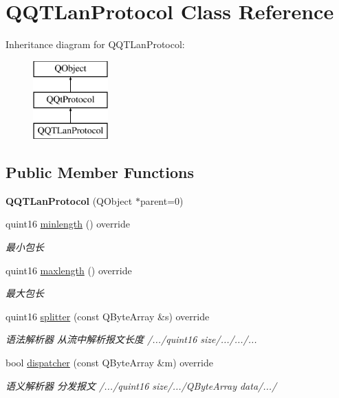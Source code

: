 \hypertarget{class_q_q_t_lan_protocol}{}\section{Q\+Q\+T\+Lan\+Protocol Class Reference}
\label{class_q_q_t_lan_protocol}
Inheritance diagram for Q\+Q\+T\+Lan\+Protocol\+:\begin{figure}[H]
\begin{center}
\leavevmode
\includegraphics[height=3.000000cm]{class_q_q_t_lan_protocol}
\end{center}
\end{figure}
\subsection*{Public Member Functions}
\begin{DoxyCompactItemize}
\item 
\mbox{\label{class_q_q_t_lan_protocol_a17f3c7094d7f6e27665d2a0824443874}} 
{\bfseries Q\+Q\+T\+Lan\+Protocol} (Q\+Object $\ast$parent=0)
\item 
quint16 \mbox{\hyperlink{class_q_q_t_lan_protocol_aa554a0956cf9790958b6959211d8cea3}{minlength}} () override
\begin{DoxyCompactList}\small\item\em 最小包长 \end{DoxyCompactList}\item 
quint16 \mbox{\hyperlink{class_q_q_t_lan_protocol_a05999312ac6df3ce5790d889f2bdc826}{maxlength}} () override
\begin{DoxyCompactList}\small\item\em 最大包长 \end{DoxyCompactList}\item 
quint16 \mbox{\hyperlink{class_q_q_t_lan_protocol_ad7cfd8f888490a3453f7868cc38d914b}{splitter}} (const Q\+Byte\+Array \&s) override
\begin{DoxyCompactList}\small\item\em 语法解析器 从流中解析报文长度 /.../quint16 size/.../.../... \end{DoxyCompactList}\item 
bool \mbox{\hyperlink{class_q_q_t_lan_protocol_ac2fc1658a5c00670974f4e845226c419}{dispatcher}} (const Q\+Byte\+Array \&m) override
\begin{DoxyCompactList}\small\item\em 语义解析器 分发报文 /.../quint16 size/.../\+Q\+Byte\+Array data/.../ \end{DoxyCompactList}\end{DoxyCompactItemize}
